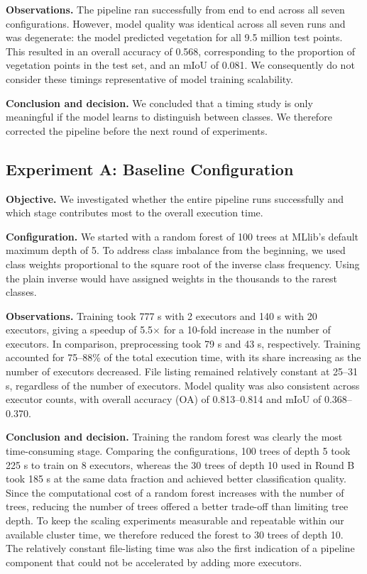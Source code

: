 \documentclass[a4paper, 11pt]{article} %
\begin{document}
\textbf{Observations.} The pipeline ran successfully from end to end across all seven configurations. However, model quality was identical across all seven runs and was degenerate: the model predicted vegetation for all 9.5 million test points. This resulted in an overall accuracy of 0.568, corresponding to the proportion of vegetation points in the test set, and an mIoU of 0.081. We consequently do not consider these timings representative of model training scalability.

\textbf{Conclusion and decision.} We concluded that a timing study is only meaningful if the model learns to distinguish between classes. We therefore corrected the pipeline before the next round of experiments.

\subsection{Experiment A: Baseline Configuration}
\textbf{Objective.} We investigated whether the entire pipeline runs successfully and which stage contributes most to the overall execution time.

\textbf{Configuration.} We started with a random forest of 100 trees at MLlib's default maximum depth of 5. To address class imbalance from the beginning, we used class weights proportional to the square root of the inverse class frequency. Using the plain inverse would have assigned weights in the thousands to the rarest classes.

\textbf{Observations.} Training took 777 s with 2 executors and 140 s with 20 executors, giving a speedup of 5.5$\times$ for a 10-fold increase in the number of executors. In comparison, preprocessing took 79 s and 43 s, respectively. Training accounted for 75--88\% of the total execution time, with its share increasing as the number of executors decreased. File listing remained relatively constant at 25--31 s, regardless of the number of executors. Model quality was also consistent across executor counts, with overall accuracy (OA) of 0.813--0.814 and mIoU of 0.368--0.370.

\textbf{Conclusion and decision.} Training the random forest was clearly the most time-consuming stage. Comparing the configurations, 100 trees of depth 5 took 225 s to train on 8 executors, whereas the 30 trees of depth 10 used in Round B took 185 s at the same data fraction and achieved better classification quality. Since the computational cost of a random forest increases with the number of trees, reducing the number of trees offered a better trade-off than limiting tree depth. To keep the scaling experiments measurable and repeatable within our available cluster time, we therefore reduced the forest to 30 trees of depth 10. The relatively constant file-listing time was also the first indication of a pipeline component that could not be accelerated by adding more executors.
\end{document}
